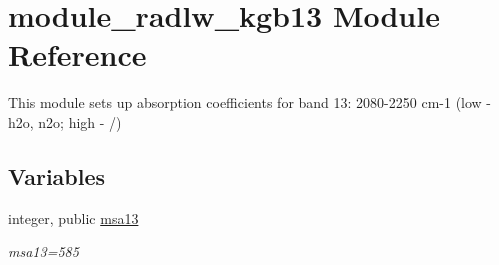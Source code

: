 \hypertarget{namespacemodule__radlw__kgb13}{}\section{module\+\_\+radlw\+\_\+kgb13 Module Reference}
\label{namespacemodule__radlw__kgb13}


This module sets up absorption coefficients for band 13\+: 2080-\/2250 cm-\/1 (low -\/ h2o, n2o; high -\/ /)  


\subsection*{Variables}
\begin{DoxyCompactItemize}
\item 
\mbox{\label{namespacemodule__radlw__kgb13_a07932a22e5f8de248765a207e170ce6f}} 
integer, public \hyperlink{namespacemodule__radlw__kgb13_a07932a22e5f8de248765a207e170ce6f}{msa13}
\begin{DoxyCompactList}\small\item\em msa13=585 \end{DoxyCompactList}\end{DoxyCompactItemize}
